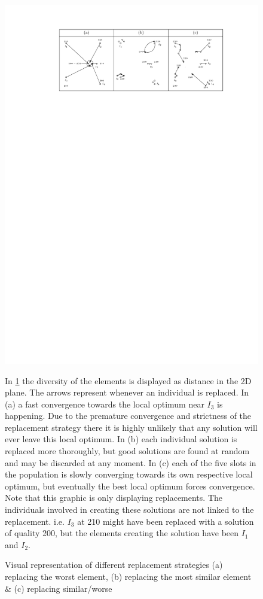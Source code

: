 \documentclass[a4paper,12pt,bibtotoc,titlepage, liststotoc,BCOR7mm,headsepline,pointlessnumbers]{scrbook}
\numberwithin{equation}{section}
\begin{document}
\begin{figure}[H] 

    \vspace*{-.25cm}
  \begin{center}
   \includegraphics[width=.8\textwidth]{Ipe/diverse_example.pdf}
  \caption{Visual representation of different replacement strategies (a) replacing the worst element, (b) replacing the most similar element \& (c) replacing similar/worse}\label{fig:img.png} 
  \label{fig:diverse_graphic}
  \end{center}
  In \ref{fig:diverse_graphic} the diversity of the elements is displayed as distance in the 2D plane. The arrows represent whenever an individual is replaced. In (a) a fast convergence towards the local optimum near $I_3$ is happening. Due to the premature convergence and strictness of the replacement strategy there it is highly unlikely that any solution will ever leave this local optimum. In (b) each individual solution is replaced more thoroughly, but good solutions are found at random and may be discarded at any moment. In (c) each of the five slots in the population is slowly converging towards its own respective local optimum, but eventually the best local optimum forces convergence. Note that this graphic is only displaying replacements. The individuals involved in creating these solutions are not linked to the replacement. i.e. $I_3$ at 210 might have been replaced with a solution of quality 200, but the elements creating the solution have been $I_1$ and $I_2$.
\end{figure}
\end{document}
